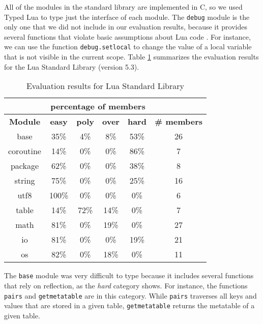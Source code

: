 All of the modules in the standard library are implemented in C, so
we used Typed Lua to type just the interface of each module.
The \texttt{debug} module is the only one that we did not include in our
evaluation results, because it provides several functions that violate
basic assumptions about Lua code \cite{luamanual}.
For instance, we can use the function \texttt{debug.setlocal} to change the value
of a local variable that is not visible in the current scope.
Table \ref{tab:evallsl} summarizes the evaluation results for the Lua Standard Library
(version 5.3).

\begin{table}[!ht]
\begin{center}
\begin{tabular}{|c|c|c|c|c|c|}
\cline{2-5}
\multicolumn{1}{c}{} & \multicolumn{4}{|c|}{percentage of members} & \multicolumn{1}{c}{} \\
\hline
\textbf{Module} & \textbf{easy} & \textbf{poly} & \textbf{over} & \textbf{hard} & \textbf{\# members} \\
\hline
base & 35\% & 4\% & 8\% & 53\% & 26 \\ %
\hline
coroutine & 14\% & 0\% & 0\% & 86\% & 7 \\ %
\hline
package & 62\% & 0\% & 0\% & 38\% & 8 \\ %
\hline
string & 75\% & 0\% & 0\% & 25\% & 16 \\ %
\hline
utf8 & 100\% & 0\% & 0\% & 0\% & 6 \\ %
\hline
table & 14\% & 72\% & 14\% & 0\% & 7 \\ %
\hline
math & 81\% & 0\% & 19\% & 0\% & 27 \\ %
\hline
io & 81\% & 0\% & 0\% & 19\% & 21 \\ %
\hline
os & 82\% & 0\% & 18\% & 0\% & 11 \\ %
\hline
\end{tabular}
\end{center}
\caption{Evaluation results for Lua Standard Library}
\label{tab:evallsl}
\end{table}

The \texttt{base} module was very difficult to type
because it includes several functions that rely on reflection,
as the \emph{hard} category shows.
For instance, the functions \texttt{pairs} and \texttt{getmetatable}
are in this category.
While \texttt{pairs} traverses all keys and values that are stored
in a given table, \texttt{getmetatable} returns the metatable of a
given table.

